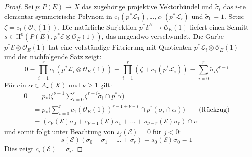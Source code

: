 \documentclass[10pt,a4paper]{article}
\begin{document}
\begin{proof}
Sei $p:P(E)\to X$ das zugehörige projektive Vektorbündel und $\tilde{\sigma}_i$ das $i$-te elementar-symmetrische Polynom in $c_1(p^\ast\mathcal{L}_1),\ldots,c_1(p^\ast\mathcal{L}_r)$ und $\tilde{\sigma}_0 = 1$. Setze $\zeta = c_1(\mathcal{O}_E(1))$. Die natürliche Surjektion $p^\ast\mathcal{E}^\vee\to \mathcal{O}_E(1)$ liefert einen Schnitt $s\in\mathrm{H}^0(P(E), p^\ast\mathcal{E}\otimes \mathcal{O}_E(1))$, das nirgendwo verschwindet. Die Garbe $p^\ast\mathcal{E}\otimes\mathcal{O}_E(1)$ hat eine vollständige Filtrierung mit Quotienten $p^\ast\mathcal{L}_i\otimes\mathcal{O}_E(1)$ und der nachfolgende Satz zeigt:
\[ 0 = \prod_{i=1}^r c_1(p^\ast\mathcal{L}_i\otimes\mathcal{O}_E(1)) = \prod_{i=1}^{r}(\zeta + c_1(p^\ast\mathcal{L}_i)) = \sum_{i=0}^r\tilde{\sigma}_i\zeta^{r-i}\]
Für ein $\alpha\in A_\bullet(X)$ und $\nu\geq 1$ gilt:
\begin{align*}
0 &= p_\ast\Big(\zeta^{\nu-1}\sum_{i=0}^r\zeta^{r-i}\tilde{\sigma}_i\cap p^\ast\alpha\Big)\\
&= p_\ast\Big(\sum_{i=0}^r c_1(\mathcal{O}_E(1))^{r-1+\nu-i}\cap p^\ast(\sigma_i\cap\alpha)\Big)\qquad \text{(Rückzug)}\\
&= (s_\nu(\mathcal{E})\sigma_0 + s_{\nu-1}(\mathcal{E})\sigma_1 + \ldots + s_{\nu-r}(\mathcal{E})\sigma_r)\cap \alpha
\end{align*}
und somit folgt unter Beachtung von $s_j(\mathcal{E}) = 0$ für $j<0$:
\[ s(\mathcal{E})(\sigma_0+\sigma_1+\ldots+\sigma_r) = s_0(\mathcal{E})\sigma_0 = 1 \]
Dies zeigt $c_i(\mathcal{E}) = \sigma_i$.
\end{proof}
\end{document}
